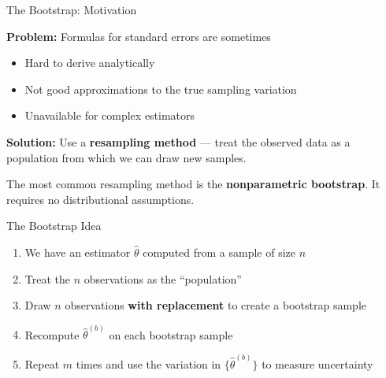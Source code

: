 \documentclass[aspectratio=169, 12pt]{beamer}
\begin{document}
\begin{frame}[shrink=8]{The Bootstrap: Motivation}

      \textbf{Problem:} Formulas for standard errors are sometimes
      \begin{itemize}
        \item Hard to derive analytically
        \item Not good approximations to the true sampling variation
        \item Unavailable for complex estimators
      \end{itemize}

      \medskip

      \textbf{Solution:} Use a \textbf{resampling method} --- treat
      the observed data as a population from which we can draw
      new samples.

      \medskip

      \begin{keybox}
        The most common resampling method is the
        \textbf{nonparametric bootstrap}.
        It requires no distributional assumptions.
      \end{keybox}
  \medskip

      \begin{definitionbox}{The Bootstrap Idea}
        \begin{enumerate}
          \item We have an estimator $\hat{\theta}$ computed
                from a sample of size $n$
          \item Treat the $n$ observations as the ``population''
          \item Draw $n$ observations \textbf{with replacement}
                to create a bootstrap sample
          \item Recompute $\hat{\theta}^{(b)}$ on each bootstrap sample
          \item Repeat $m$ times and use the variation in
                $\{\hat{\theta}^{(b)}\}$ to measure uncertainty
        \end{enumerate}
      \end{definitionbox}

\end{frame}
\end{document}
